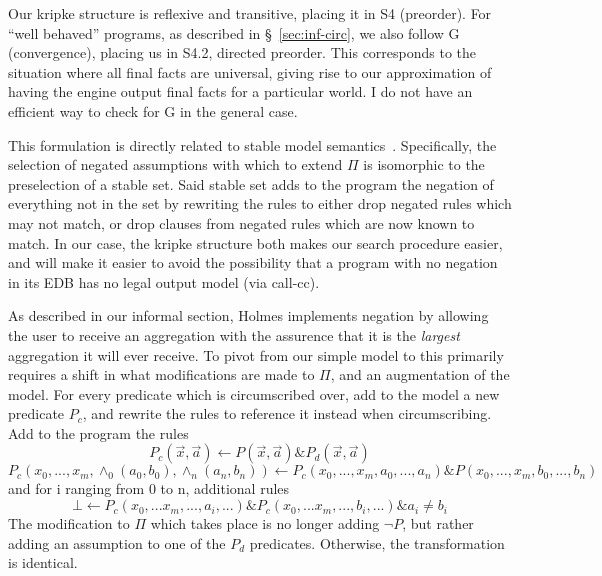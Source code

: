 Our kripke structure is reflexive and transitive, placing it in S4 (preorder).
For ``well behaved'' programs, as described in \S~\ref{sec:inf-circ}, we also follow G (convergence), placing us in S4.2, directed preorder.
This corresponds to the situation where all final facts are universal, giving rise to our approximation of having the engine output final facts for a particular world.
I do not have an efficient way to check for G in the general case.

This formulation is directly related to stable model semantics~\cite{stable-model}.
Specifically, the selection of negated assumptions with which to extend $\Pi$ is isomorphic to the preselection of a stable set.
Said stable set adds to the program the negation of everything not in the set by rewriting the rules to either drop negated rules which may not match, or drop clauses from negated rules which are now known to match.
In our case, the kripke structure both makes our search procedure easier, and will make it easier to avoid the possibility that a program with no negation in its EDB has no legal output model (via call-cc).

As described in our informal section, Holmes implements negation by allowing the user to receive an aggregation with the assurence that it is the \emph{largest} aggregation it will ever receive.
To pivot from our simple model to this primarily requires a shift in what modifications are made to $\Pi$, and an augmentation of the model.
For every predicate which is circumscribed over, add to the model a new predicate $P_c$, and rewrite the rules to reference it instead when circumscribing.
Add to the program the rules
\[P_c(\vec{x}, \vec{a}) \leftarrow P(\vec{x}, \vec{a}) \& P_d(\vec{x}, \vec{a})\]
\[P_c(x_0, ..., x_m, \wedge_0(a_0, b_0), \wedge_n(a_n, b_n)) \leftarrow P_c(x_0, ..., x_m, a_0, ..., a_n) \& P(x_0, ..., x_m, b_0, ..., b_n)\]
and for i ranging from 0 to n, additional rules
\[\bot \leftarrow P_c(x_0, ... x_m, ..., a_i, ...) \& P_c(x_0, ... x_m, ..., b_i, ...) \& a_i \neq b_i\]
The modification to $\Pi$ which takes place is no longer adding $\neg P$, but rather adding an assumption to one of the $P_d$ predicates.
Otherwise, the transformation is identical.

